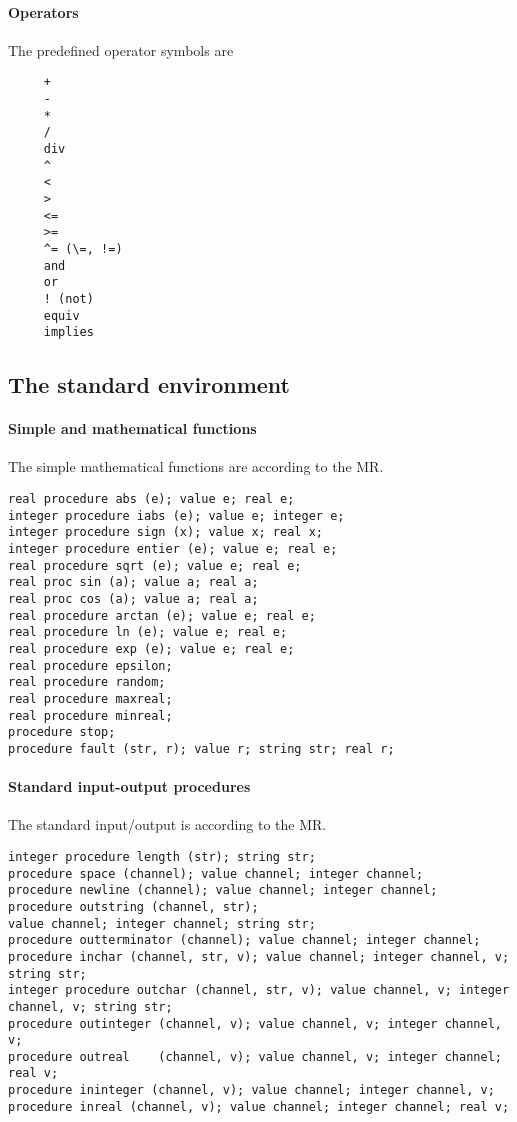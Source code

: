 \documentclass[11pt]{article}
\begin{document}
\paragraph{Operators}
The predefined operator symbols are
{\footnotesize
\begin{verbatim}
     +
     -
     *
     /
     div
     ^ 
     <
     >
     <=
     >=
     ^= (\=, !=)
     and
     or
     ! (not)
     equiv
     implies
\end{verbatim}
}
\subsection{The standard environment}

\paragraph{Simple and mathematical functions}
The simple mathematical functions are according to the MR.
{\footnotesize
\begin{verbatim}
real procedure abs (e); value e; real e; 
integer procedure iabs (e); value e; integer e; 
integer procedure sign (x); value x; real x; 
integer procedure entier (e); value e; real e; 
real procedure sqrt (e); value e; real e; 
real proc sin (a); value a; real a; 
real proc cos (a); value a; real a; 
real procedure arctan (e); value e; real e; 
real procedure ln (e); value e; real e; 
real procedure exp (e); value e; real e; 
real procedure epsilon; 
real procedure random; 
real procedure maxreal; 
real procedure minreal; 
procedure stop; 
procedure fault (str, r); value r; string str; real r; 
\end{verbatim}
}

\paragraph{Standard input-output procedures}
The standard input/output is according to the MR.
{\footnotesize
\begin{verbatim}
integer procedure length (str); string str; 
procedure space (channel); value channel; integer channel; 
procedure newline (channel); value channel; integer channel;
procedure outstring (channel, str);
value channel; integer channel; string str; 
procedure outterminator (channel); value channel; integer channel; 
procedure inchar (channel, str, v); value channel; integer channel, v; string str; 
integer procedure outchar (channel, str, v); value channel, v; integer channel, v; string str; 
procedure outinteger (channel, v); value channel, v; integer channel, v; 
procedure outreal    (channel, v); value channel, v; integer channel; real v; 
procedure ininteger (channel, v); value channel; integer channel, v; 
procedure inreal (channel, v); value channel; integer channel; real v; 
\end{verbatim}
}
\end{document}
